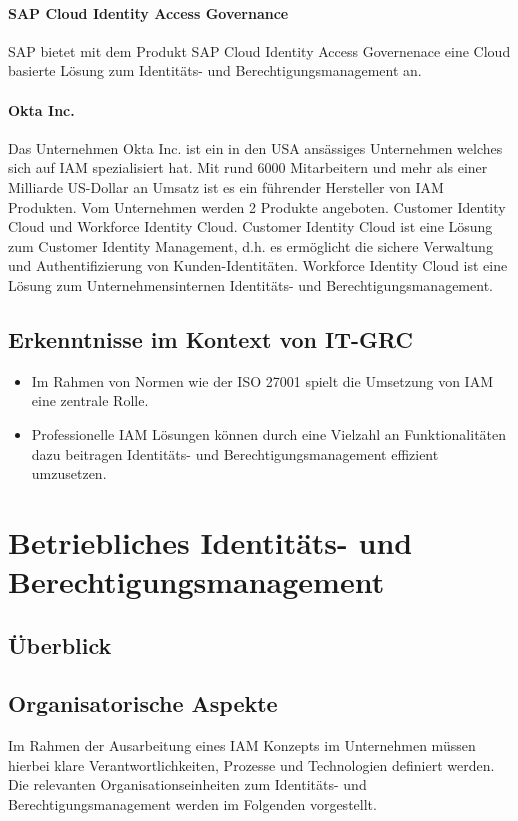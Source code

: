 \documentclass[11pt]{article}
\begin{document}
\paragraph{SAP Cloud Identity Access Governance}
SAP bietet mit dem Produkt \glqq{}SAP Cloud Identity Access Governenace\grqq{} eine Cloud basierte Lösung zum Identitäts- und Berechtigungsmanagement an.
\paragraph{Okta Inc.}
Das Unternehmen Okta Inc. ist ein in den USA ansässiges Unternehmen welches sich auf IAM spezialisiert hat. Mit rund 6000 Mitarbeitern und mehr als einer Milliarde US-Dollar an Umsatz ist es ein führender Hersteller von IAM Produkten. Vom Unternehmen werden 2 Produkte angeboten. Customer Identity Cloud und Workforce Identity Cloud. Customer Identity Cloud ist eine Lösung zum Customer Identity Management, d.h. es ermöglicht die sichere Verwaltung und Authentifizierung von Kunden-Identitäten. Workforce Identity Cloud ist eine Lösung zum Unternehmensinternen Identitäts- und Berechtigungsmanagement.
\subsection{Erkenntnisse im Kontext von IT-GRC}
\begin{itemize}
  \item Im Rahmen von Normen wie der ISO 27001 spielt die Umsetzung von IAM eine zentrale Rolle.
  \item Professionelle IAM Lösungen können durch eine Vielzahl an Funktionalitäten dazu beitragen Identitäts- und Berechtigungsmanagement effizient umzusetzen.
\end{itemize}
\section{Betriebliches Identitäts- und Berechtigungsmanagement}
\label{sec:betrieb}
\subsection{Überblick}
\subsection{Organisatorische Aspekte}
Im Rahmen der Ausarbeitung eines IAM Konzepts im Unternehmen müssen hierbei klare Verantwortlichkeiten, Prozesse und Technologien definiert werden. Die relevanten Organisationseinheiten zum Identitäts- und Berechtigungsmanagement werden im Folgenden vorgestellt.
\end{document}
